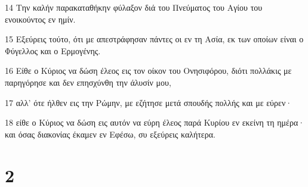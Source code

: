 \par 14 Την καλήν παρακαταθήκην φύλαξον διά του Πνεύματος του Αγίου του ενοικούντος εν ημίν.
\par 15 Εξεύρεις τούτο, ότι με απεστράφησαν πάντες οι εν τη Ασία, εκ των οποίων είναι ο Φύγελλος και ο Ερμογένης.
\par 16 Είθε ο Κύριος να δώση έλεος εις τον οίκον του Ονησιφόρου, διότι πολλάκις με παρηγόρησε και δεν επησχύνθη την άλυσίν μου,
\par 17 αλλ' ότε ήλθεν εις την Ρώμην, με εζήτησε μετά σπουδής πολλής και με εύρεν·
\par 18 είθε ο Κύριος να δώση εις αυτόν να εύρη έλεος παρά Κυρίου εν εκείνη τη ημέρα· και όσας διακονίας έκαμεν εν Εφέσω, συ εξεύρεις καλήτερα.

\chapter{2}

